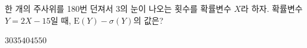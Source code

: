 한 개의 주사위를 180번 던져서 $3$의 눈이 나오는 횟수를 확률변수 $X$라 하자. 확률변수 $Y=2X-15$일 때, $\mathrm{E}(Y)-\sigma(Y)$의 값은?
\begin{choices32}{$30$}{$35$}{$40$}{$45$}{$50$}\end{choices32}
